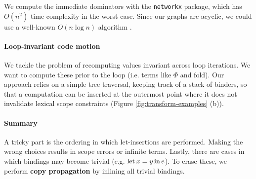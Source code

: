 We compute the immediate dominators with the \texttt{networkx} package, which has $O(n^2)$ time complexity in the worst-case. Since our graphs are acyclic, we could use a well-known $O(n \log n)$ algorithm \cite{ramalingam1994incremental}.

\paragraph{Loop-invariant code motion} We tackle the problem of recomputing values invariant across loop iterations. We want to compute these prior to the loop (i.e. terms like $\Phi$ and $\mathrm{fold}$). Our approach relies on a simple tree traversal, keeping track of a stack of binders, so that a computation can be inserted at the outermost point where it does not invalidate lexical scope constraints (Figure \ref{fig:transform-examples} (b)).


\paragraph{Summary}
A tricky part is the ordering in which let-insertions are performed. Making the wrong choices results in scope errors or infinite terms. 
Lastly, there are cases in which bindings may become trivial (e.g. $\mathrm{let}\,{x}={y}\,\mathrm{in}\,{e}$). To erase these, we perform \textbf{copy propagation} by inlining all trivial bindings.

